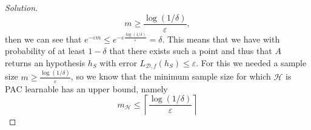 \documentclass[10pt, a4paper, twoside]{amsart}
\newenvironment{solution}
               {\let\oldqedsymbol=\qedsymbol
                \renewcommand{\qedsymbol}{$\blacktriangleleft$}
                \begin{proof}[Solution]}
               {\end{proof}
                \renewcommand{\qedsymbol}{\oldqedsymbol}}
\begin{document}
\begin{solution}
\begin{equation*}
  m \geq \frac{\log(1/\delta)}{\varepsilon},
\end{equation*}
then we can see that $e^{-\varepsilon m} \leq e^{-\varepsilon \frac{\log(1/\delta)}{\varepsilon}} = \delta$. This means that we have with probability of at least $1- \delta$ that there exists such a point and thus that $A$ returns an hypothesis $h_S$ with error $L_{\mathcal{D},f}(h_S) \leq \varepsilon$. For this we needed a sample size $m \geq \frac{\log(1/\delta)}{\varepsilon}$, so we know that the minimum sample size for which $\mathcal{H}$ is PAC learnable has an upper bound, namely 
  \begin{equation*}
    m_{\mathcal{H}}\leq \left\lceil \frac{\log(1/\delta )}{\varepsilon} \right\rceil
  \end{equation*}
\end{solution}
\end{document}

